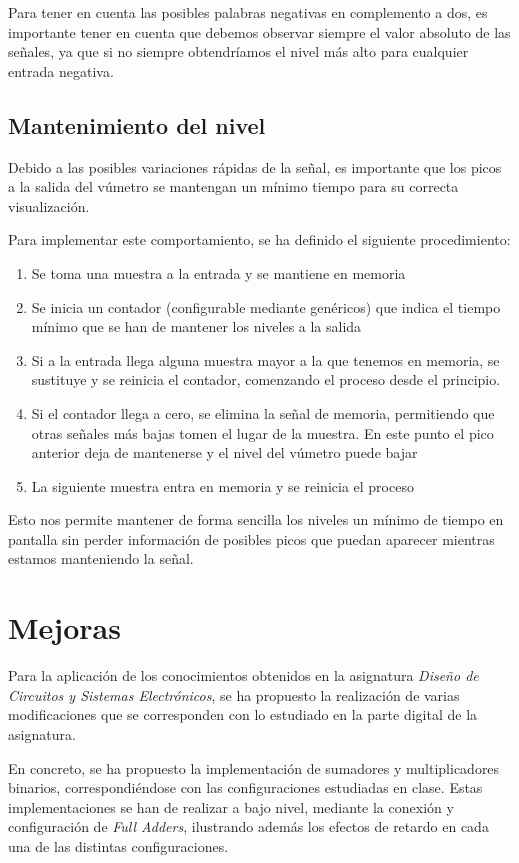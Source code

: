 \documentclass[a4paper,12pt]{article}
\begin{document}
Para tener en cuenta las posibles palabras negativas en complemento a dos, es importante tener en cuenta que debemos observar siempre el valor absoluto de las señales, ya que si no siempre obtendríamos el nivel más alto para cualquier entrada negativa.

\subsection{Mantenimiento del nivel}
Debido a las posibles variaciones rápidas de la señal, es importante que los picos a la salida del vúmetro se mantengan un mínimo tiempo para su correcta visualización.

Para implementar este comportamiento, se ha definido el siguiente procedimiento:
\begin{enumerate}
\item Se toma una muestra a la entrada y se mantiene en memoria
\item Se inicia un contador (configurable mediante genéricos) que indica el tiempo mínimo que se han de mantener los niveles a la salida
\item Si a la entrada llega alguna muestra mayor a la que tenemos en memoria, se sustituye y se reinicia el contador, comenzando el proceso desde el principio.
\item Si el contador llega a cero, se elimina la señal de memoria, permitiendo que otras señales más bajas tomen el lugar de la muestra. En este punto el pico anterior deja de mantenerse y el nivel del vúmetro puede bajar
\item La siguiente muestra entra en memoria y se reinicia el proceso
\end{enumerate}

Esto nos permite mantener de forma sencilla los niveles un mínimo de tiempo en pantalla sin perder información de posibles picos que puedan aparecer mientras estamos manteniendo la señal.

\section{Mejoras}
Para la aplicación de los conocimientos obtenidos en la asignatura \emph{Diseño de Circuitos y Sistemas Electrónicos}, se ha propuesto la realización de varias modificaciones que se corresponden con lo estudiado en la parte digital de la asignatura.

En concreto, se ha propuesto la implementación de sumadores y multiplicadores binarios, correspondiéndose con las configuraciones estudiadas en clase. Estas implementaciones se han de realizar a bajo nivel, mediante la conexión y configuración de \emph{Full Adders}, ilustrando además los efectos de retardo en cada una de las distintas configuraciones.
\end{document}
